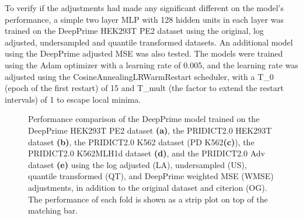 To verify if the adjustments had made any significant different on the model's performance, a simple two layer MLP with 128 hidden units in each layer was trained on the DeepPrime HEK293T PE2 dataset using the original, log adjusted, undersampled and quantile transformed datasets. An additional model using the DeepPrime adjusted MSE was also tested. The models were trained using the Adam optimizer with a learning rate of 0.005, and the learning rate was adjusted using the CosineAnnealingLRWarmRestart scheduler, with a T\_0 (epoch of the first restart) of 15 and T\_mult (the factor to extend the restart intervals) of 1 to escape local minima. 

\begin{figure}
    \centering
    \vspace{-3mm} %
    \vspace{-3mm}
    \vspace{-3mm}
    \vspace{-3mm}
    \vspace{-3mm}
    \caption[DeepPrime model performance comparison after adjustments]{Performance comparison of the DeepPrime model trained on the DeepPrime HEK293T PE2 dataset \textbf{(a)}, the PRIDICT2.0 HEK293T dataset \textbf{(b)}, the PRIDICT2.0 K562 dataset (PD K562\textbf{(c)}), the PRIDICT2.0 K562MLH1d dataset \textbf{(d)}, and the PRIDICT2.0 Adv dataset \textbf{(e)} using the log adjusted (LA), undersampled (US), quantile transformed (QT), and DeepPrime weighted MSE (WMSE) adjustments, in addition to the original dataset and citerion (OG). 
    The performance of each fold is shown as a strip plot on top of the matching bar.}
    \label{fig:adjustment-performance}
\end{figure}

